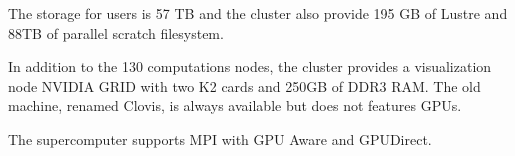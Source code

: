 The storage for users is 57 TB and the cluster also provide 195 GB of Lustre and 88TB of parallel scratch filesystem. 

In addition to the 130 computations nodes, the cluster provides a visualization node NVIDIA GRID with two K2 cards and 250GB of DDR3 RAM. 
The old machine, renamed Clovis, is always available but does not features GPUs. 

The supercomputer supports MPI with GPU Aware and GPUDirect. 
